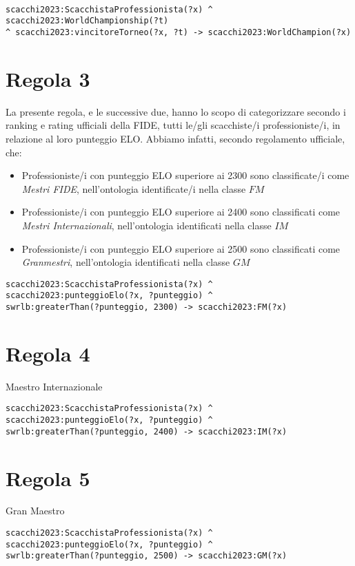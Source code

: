 \documentclass[12pt]{book}
\begin{document}
\newpage

\begin{verbatim}

scacchi2023:ScacchistaProfessionista(?x) ^ scacchi2023:WorldChampionship(?t) 
^ scacchi2023:vincitoreTorneo(?x, ?t) -> scacchi2023:WorldChampion(?x)

\end{verbatim}

\section{Regola 3}

La presente regola, e le successive due, hanno lo scopo di
categorizzare secondo i ranking e rating ufficiali della FIDE, tutti
le/gli scacchiste/i professioniste/i, in relazione al loro punteggio ELO.
Abbiamo infatti, secondo regolamento ufficiale, che:
\begin{itemize}
  \item Professioniste/i con punteggio ELO superiore ai 2300 sono
    classificate/i come \textit{Mestri FIDE}, nell'ontologia
    identificate/i nella classe $FM$
  \item Professioniste/i con punteggio ELO superiore ai 2400 sono
    classificati come \textit{Mestri Internazionali}, nell'ontologia
    identificati nella classe $IM$
  \item Professioniste/i con punteggio ELO superiore ai 2500 sono
    classificati come \textit{Granmestri}, nell'ontologia
    identificati nella classe $GM$
\end{itemize}

\begin{verbatim}
scacchi2023:ScacchistaProfessionista(?x) ^
scacchi2023:punteggioElo(?x, ?punteggio) ^
swrlb:greaterThan(?punteggio, 2300) -> scacchi2023:FM(?x)
\end{verbatim}

\section{Regola 4}

Maestro Internazionale

\begin{verbatim}
scacchi2023:ScacchistaProfessionista(?x) ^
scacchi2023:punteggioElo(?x, ?punteggio) ^
swrlb:greaterThan(?punteggio, 2400) -> scacchi2023:IM(?x)
\end{verbatim}

\section{Regola 5}

Gran Maestro

\begin{verbatim}
scacchi2023:ScacchistaProfessionista(?x) ^
scacchi2023:punteggioElo(?x, ?punteggio) ^
swrlb:greaterThan(?punteggio, 2500) -> scacchi2023:GM(?x)
\end{verbatim}
\end{document}
